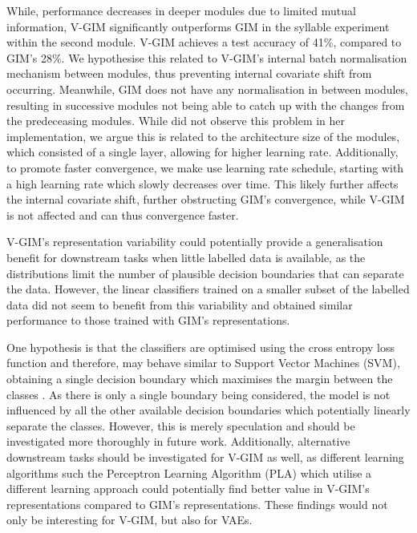 		While, performance decreases in deeper modules due to limited mutual information, V-GIM significantly outperforms GIM in the syllable experiment within the second module. V-GIM achieves a test accuracy of 41\%, compared to GIM's 28\%. We hypothesise this related to V-GIM's internal batch normalisation mechanism between modules, thus preventing internal covariate shift from occurring. Meanwhile, GIM does not have any normalisation in between modules, resulting in successive modules not being able to catch up with the changes from the predeceasing modules. While \citeauthor{lowePuttingEndEndtoEnd2020} did not observe this problem in her implementation, we argue this is related to the architecture size of the modules, which consisted of a single layer, allowing for higher learning rate. Additionally, to promote faster convergence, we make use learning rate schedule, starting with a high learning rate which slowly decreases over time. This likely further affects the internal covariate shift, further obstructing GIM's convergence, while V-GIM is not affected and can thus convergence faster.
		 
		
		
		
		V-GIM's representation variability could potentially provide a generalisation benefit for downstream tasks when little labelled data is available, as the distributions limit the number of plausible decision boundaries that can separate the data. However, the linear classifiers trained on a smaller subset of the labelled data did not seem to benefit from this variability and obtained similar performance to those trained with GIM's representations. 
		
		One hypothesis is that the classifiers are optimised using the cross entropy loss function and therefore, may behave similar to Support Vector Machines (SVM), obtaining a single decision boundary which maximises the margin between the classes \citep{hearstSupportVectorMachines1998, nobleWhatSupportVector2006}. As there is only a single boundary being considered, the model is not influenced by all the other available decision boundaries which potentially linearly separate the classes. However, this is merely speculation and should be investigated more thoroughly in future work. Additionally, alternative downstream tasks should be investigated for V-GIM as well, as different learning algorithms such the Perceptron Learning Algorithm (PLA) which utilise a different learning approach could potentially find better value \cite{gallantPerceptronbasedLearningAlgorithms1990} in V-GIM's representations compared to GIM's representations. These findings would not only be interesting for V-GIM, but also for VAEs.
		
